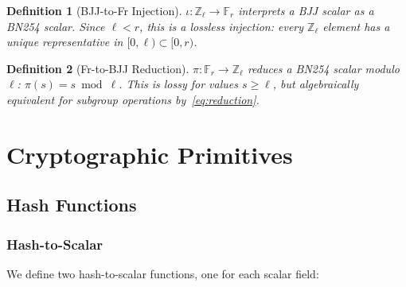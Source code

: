 \documentclass[11pt,a4paper]{article}
\newtheorem{definition}{Definition}[section]
\newcommand{\F}{\mathbb{F}}
\newcommand{\Z}{\mathbb{Z}}
\newcommand{\Fr}{\F_r}
\newcommand{\Fl}{\Z_\ell}
\begin{document}
\begin{definition}[BJJ-to-Fr Injection]
  \label{def:bjjtofr}
  $\iota: \Fl \to \Fr$ interprets a BJJ scalar as a BN254 scalar. Since
  $\ell < r$, this is a lossless injection: every $\Fl$ element has a unique
  representative in $[0, \ell) \subset [0, r)$.
\end{definition}

\begin{definition}[Fr-to-BJJ Reduction]
  \label{def:frtobjj}
  $\pi: \Fr \to \Fl$ reduces a BN254 scalar modulo $\ell$:
  $\pi(s) = s \bmod \ell$. This is lossy for values $s \ge \ell$, but
  algebraically equivalent for subgroup operations by~\eqref{eq:reduction}.
\end{definition}

\section{Cryptographic Primitives}
\label{sec:primitives}

\subsection{Hash Functions}
\label{sec:hash}

\subsubsection{Hash-to-Scalar}

We define two hash-to-scalar functions, one for each scalar field:
\end{document}
